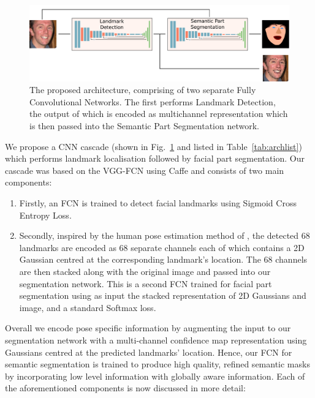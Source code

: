 \begin{figure}
\includegraphics[width=\linewidth]{figs/Proposed.pdf}
\caption[Our proposed end-to-end architecture for facial part
  segmentation]{The proposed architecture, comprising of two separate
  Fully Convolutional Networks. The first performs Landmark Detection,
  the output of which is encoded as multichannel representation which
  is then passed into the Semantic Part Segmentation network.}
\label{fig:proposed}
\end{figure}

We propose a CNN cascade (shown in Fig.~\ref{fig:proposed} and listed
in Table~\ref{tab:archlist}) which performs landmark localisation
followed by facial part segmentation. Our cascade was based on the
VGG-FCN \cite{simonyan2014vgg,long2015fully} using Caffe
\cite{jia2014caffe} and consists of two main components:
\begin{enumerate}
\item Firstly, an FCN is trained to detect facial landmarks using
  Sigmoid Cross Entropy Loss.
\item Secondly, inspired by the human pose estimation method of
  \cite{carreira2016human}, the detected 68 landmarks are encoded as
  68 separate channels each of which contains a 2D Gaussian centred
  at the corresponding landmark's location. The 68 channels are then
  stacked along with the original image and passed into our
  segmentation network. This is a second FCN trained for facial part
  segmentation using as input the stacked representation of 2D
  Gaussians and image, and a standard Softmax loss.
\end{enumerate}

Overall we encode pose specific information by augmenting the input to
our segmentation network with a multi-channel confidence map
representation using Gaussians centred at the predicted landmarks'
location. Hence, our FCN for semantic segmentation is trained to
produce high quality, refined semantic masks by incorporating low
level information with globally aware information. Each of the
aforementioned components is now discussed in more detail:

